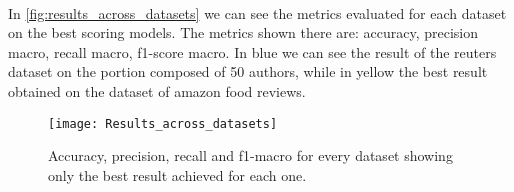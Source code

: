 \paragraph{}
In \autoref{fig:results_across_datasets} we can see the metrics evaluated for each dataset on the best scoring models. The metrics shown there are: accuracy, precision macro, recall macro, f1-score macro.
In blue we can see the result of the reuters dataset on the portion composed of 50 authors, while in yellow the best result obtained on the dataset of amazon food reviews.
\begin{figure}[ht]
	\centering
	\texttt{[image: Results\_across\_datasets]}
	\caption[Best performance across all datasets]{Accuracy, precision, recall and f1-macro for every dataset showing only the best result achieved for each one.}
	\label{fig:results_across_datasets}
\end{figure}
